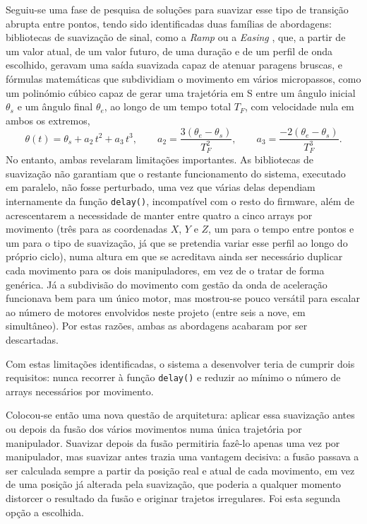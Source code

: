 Seguiu-se uma fase de pesquisa de soluções para suavizar esse tipo de transição abrupta entre pontos, tendo sido identificadas duas famílias de abordagens: bibliotecas de suavização de sinal, como a \textit{Ramp} \parencite{Garnavault2016Ramp} ou a \textit{Easing} \parencite{ArminJo2019ServoEasing}, que, a partir de um valor atual, de um valor futuro, de uma duração e de um perfil de onda escolhido, geravam uma saída suavizada capaz de atenuar paragens bruscas, e fórmulas matemáticas que subdividiam o movimento em vários micropassos, como um polinómio cúbico capaz de gerar uma trajetória em S entre um ângulo inicial \(\theta_s\) e um ângulo final \(\theta_e\), ao longo de um tempo total \(T_F\), com velocidade nula em ambos os extremos,
\[
\theta(t) = \theta_s + a_2\,t^2 + a_3\,t^3, \qquad a_2 = \frac{3(\theta_e-\theta_s)}{T_F^2}, \qquad a_3 = \frac{-2(\theta_e-\theta_s)}{T_F^3}.
\]
No entanto, ambas revelaram limitações importantes. As bibliotecas de suavização não garantiam que o restante funcionamento do sistema, executado em paralelo, não fosse perturbado, uma vez que várias delas dependiam internamente da função \texttt{delay()}, incompatível com o resto do firmware, além de acrescentarem a necessidade de manter entre quatro a cinco arrays por movimento (três para as coordenadas \(X\), \(Y\) e \(Z\), um para o tempo entre pontos e um para o tipo de suavização, já que se pretendia variar esse perfil ao longo do próprio ciclo), numa altura em que se acreditava ainda ser necessário duplicar cada movimento para os dois manipuladores, em vez de o tratar de forma genérica. Já a subdivisão do movimento com gestão da onda de aceleração funcionava bem para um único motor, mas mostrou-se pouco versátil para escalar ao número de motores envolvidos neste projeto (entre seis a nove, em simultâneo). Por estas razões, ambas as abordagens acabaram por ser descartadas.

Com estas limitações identificadas, o sistema a desenvolver teria de cumprir dois requisitos: nunca recorrer à função \texttt{delay()} e reduzir ao mínimo o número de arrays necessários por movimento.

Colocou-se então uma nova questão de arquitetura: aplicar essa suavização antes ou depois da fusão dos vários movimentos numa única trajetória por manipulador. Suavizar depois da fusão permitiria fazê-lo apenas uma vez por manipulador, mas suavizar antes trazia uma vantagem decisiva: a fusão passava a ser calculada sempre a partir da posição real e atual de cada movimento, em vez de uma posição já alterada pela suavização, que poderia a qualquer momento distorcer o resultado da fusão e originar trajetos irregulares. Foi esta segunda opção a escolhida.

